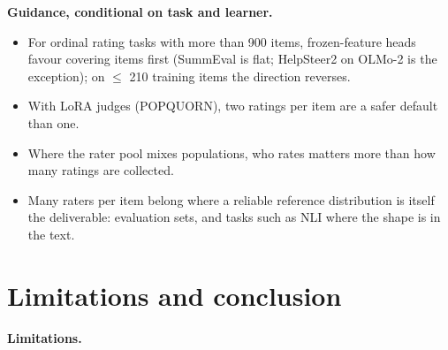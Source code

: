 \documentclass[10pt,twocolumn]{article}
\providecommand{\tightlist}{\setlength{\itemsep}{0pt}\setlength{\parskip}{0pt}}
\begin{document}
\textbf{Guidance, conditional on task and learner.}

\begin{itemize}
\tightlist
\item
  For ordinal rating tasks with more than 900 items, frozen-feature heads favour covering items first (SummEval is flat; HelpSteer2 on OLMo-2 is the exception); on $\leq$ 210 training items the direction reverses.
\item
  With LoRA judges (POPQUORN), two ratings per item are a safer default than one.
\item
  Where the rater pool mixes populations, who rates matters more than how many ratings are collected.
\item
  Many raters per item belong where a reliable reference distribution is itself the deliverable: evaluation sets, and tasks such as NLI where the shape is in the text.
\end{itemize}

\section{Limitations and conclusion}

\textbf{Limitations.}
\end{document}
